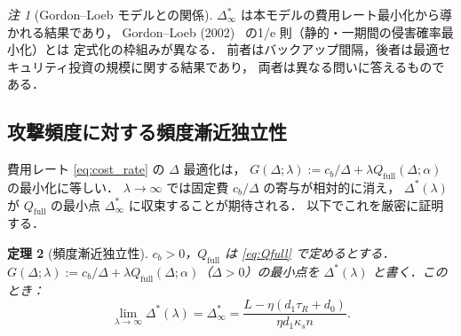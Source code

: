 \documentclass[12pt,a4paper]{article}
\theoremstyle{plain}
\newtheorem{theorem}{定理}[section]
\theoremstyle{definition}
\theoremstyle{remark}
\newtheorem{remark}[theorem]{注}
\newcommand{\Qf}{Q_{\mathrm{full}}}
\newcommand{\Dopt}{\Delta^{*}}
\newcommand{\Dinf}{\Delta^{*}_{\infty}}
\begin{document}
\begin{remark}[Gordon--Loeb モデルとの関係]\label{rem:gl}
$\Dinf$ は本モデルの費用レート最小化から導かれる結果であり，
Gordon--Loeb (2002)~\cite{gordon2002} の1/e 則（静的・一期間の侵害確率最小化）とは
定式化の枠組みが異なる．
前者はバックアップ間隔，後者は最適セキュリティ投資の規模に関する結果であり，
両者は異なる問いに答えるものである．
\end{remark}

\subsection{攻撃頻度に対する頻度漸近独立性}

費用レート \eqref{eq:cost_rate} の $\Delta$ 最適化は，
$G(\Delta;\lambda):=c_b/\Delta+\lambda\Qf(\Delta;\alpha)$ の最小化に等しい．
$\lambda\to\infty$ では固定費 $c_b/\Delta$ の寄与が相対的に消え，
$\Dopt(\lambda)$ が $\Qf$ の最小点 $\Dinf$ に収束することが期待される．
以下でこれを厳密に証明する．

\begin{theorem}[頻度漸近独立性]\label{thm:convergence}
$c_b>0$，$\Qf$ は \eqref{eq:Qfull} で定めるとする．
$G(\Delta;\lambda):=c_b/\Delta+\lambda\Qf(\Delta;\alpha)$（$\Delta>0$）の最小点を
$\Dopt(\lambda)$ と書く．このとき：
\begin{equation}\label{eq:limit}
\lim_{\lambda\to\infty}\Dopt(\lambda)=\Dinf=\frac{L-\eta(d_1\tau_R+d_0)}{\eta d_1\kappa_s n}.
\end{equation}
\end{theorem}
\end{document}
